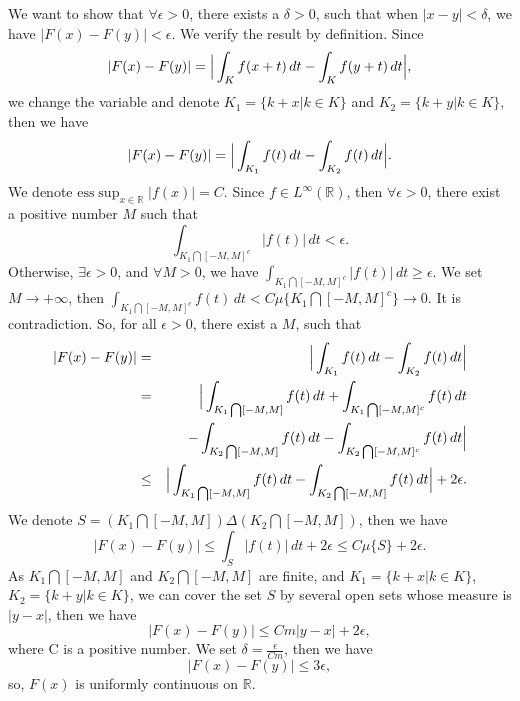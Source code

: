 \documentclass[12pt]{article}
\begin{document}
We want to show that $\forall \epsilon > 0$, there exists a $\delta > 0$, such that when $|x - y| < \delta$, we have $|F(x) - F(y)| < \epsilon$. We verify the result by definition. Since
\begin{equation*}
   |F(x) - F(y)|  =  \Big{|} \int_{K}^{} f(x + t) \, d t - \int_{K}^{} f(y + t) \, d t \Big{|},
\end{equation*}
we change the variable and denote $K_{1} = \{k + x| k \in K \}$ and $K_{2} = \{ k + y| k \in K \}$, then we have
\begin{equation*}
   |F(x) - F(y)|  =  \Big{|} \int_{K_{1}}^{} f(t) \, d t - \int_{K_{2}}^{} f(t) \, d t \Big{|}.
\end{equation*}
We denote $\text{ess} \sup_{x \in \mathbb{R}} |f(x)| = C$. Since $f \in L^{\infty} (\mathbb{R})$, then $\forall \epsilon > 0$, there exist a positive number $M$ such that
\begin{equation*}
    \int_{K_{1} \bigcap [-M, M]^{c}}^{} |f(t)| \, d t < \epsilon.
\end{equation*}
Otherwise, $\exists \epsilon > 0$, and $\forall M > 0$, we have $\int_{K_{1} \bigcap [-M, M]^{c}}^{} |f(t)| \, d t \geq \epsilon$. We set $M \to + \infty$, then $\int_{K_{1} \bigcap [-M, M]^{c}}^{} f(t) \, d t  < C \mu \{K_{1} \bigcap [-M, M]^{c} \} \to 0$. It is contradiction. So, for all $\epsilon > 0$, there exist a $M$, such that
\begin{eqnarray*}
|F(x) - F(y)| & = & \Big{|} \int_{K_{1}}^{} f(t) \, d t - \int_{K_{2}}^{} f(t) \, d t \Big{|} \\
& = & \Big{|} \int_{K_{1} \bigcap [-M, M]}^{} f(t) \, d t  + \int_{K_{1} \bigcap [-M, M]^{c}}^{} f(t) \, d t  \\
& & - \int_{K_{2} \bigcap [-M, M]}^{} f(t) \, d t - \int_{K_{2} \bigcap [-M, M]^{c}}^{} f(t) \, d t \Big{|}   \\
&\leq&  \Big{|} \int_{K_{1} \bigcap [-M, M]}^{} f(t) \, d t - \int_{K_{2} \bigcap [-M, M]}^{} f(t) \, d t \Big{|} + 2 \epsilon.
\end{eqnarray*}
We denote $S = (K_{1} \bigcap [-M, M]) \Delta (K_{2} \bigcap [-M, M])$, then we have
\begin{equation*}
    |F(x) - F(y)|  \leq  \int_{S}^{} |f(t)| \, d t + 2 \epsilon \leq C \mu \{S \} + 2 \epsilon.
\end{equation*}
As $K_{1} \bigcap [-M, M]$ and $K_{2} \bigcap [-M, M]$ are finite, and $K_{1} = \{k + x| k \in K \}$, $K_{2} = \{ k + y| k \in K \}$, we can cover the set $S$ by several open sets whose measure is $|y -x|$, then we have
\begin{equation*}
    |F(x) - F(y)| \leq C m |y - x| + 2 \epsilon,
\end{equation*}
where C is a positive number. We set $\delta = \frac{\epsilon}{Cm}$, then we have
\begin{equation*}
    |F(x) - F(y)| \leq  3 \epsilon,
\end{equation*}
so, $F(x)$ is uniformly continuous on $\mathbb{R}$.
\end{document}
